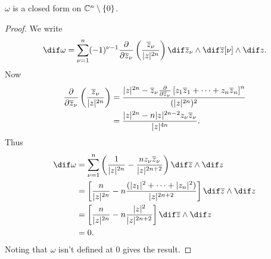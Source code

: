 \begin{lemma}\label{lem:BMcalc2}
    $\omega$ is a closed form on $\mathbb{C}^n \setminus \{ 0 \}$.
\end{lemma}
\begin{proof}
    We write
    \begin{align*}
        \dif \omega = \sum_{\nu=1}^n (-1)^{\nu - 1} \frac{\difp}{\difp \zz_\nu} \br{\frac{\zz_\nu}{|z|^{2n}}} \dif \zz_\nu \wedge \dif \zz[\nu] \wedge \dif z.
    \end{align*}
    Now
    \begin{align*}
        \frac{\partial}{\partial \overline{z}_\nu} \left( \frac{\overline{z}_\nu}{|z|^{2n}} \right) &= \frac{|z|^{2n} - \overline{z}_\nu \frac{\partial}{\partial \overline{z}_\nu} \left[z_1 \overline{z}_1 + \cdots + z_n \overline{z}_n \right]^n}{(|z|^{2n})^2}\\
        &= \frac{|z|^{2n} - n |z|^{2n-2} z_\nu \overline{z}_\nu}{|z|^{4n}}.
    \end{align*}
    Thus
    \begin{align*}
        \dif \omega &= \sum_{\nu = 1}^n \br{\frac{1}{|z|^{2n}} - \frac{n z_\nu \zz_\nu}{|z|^{2n + 2}}} \dif \zz \wedge \dif z\\
        &= \left[ \frac{n}{|z|^{2n}} - n \frac{ (|z_1|^2 + \cdots + |z_n|^2)}{|z|^{2n+2}} \right] \dif \zz \wedge \dif z\\
        &= \left[ \frac{n}{|z|^{2n}} - n \frac{|z|^2}{|z|^{2n+2}}  \right] \dif \zz \wedge \dif z\\
        &= 0.
    \end{align*}
    Noting that $\omega$ isn't defined at $0$ gives the result.
\end{proof}

